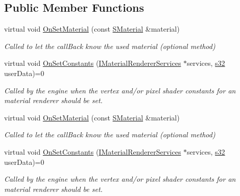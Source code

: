 \subsection*{Public Member Functions}
\begin{DoxyCompactItemize}
\item 
virtual void \hyperlink{classirr_1_1video_1_1IShaderConstantSetCallBack_a837ad9419ca4c17b011af75bb24e7a72}{On\+Set\+Material} (const \hyperlink{classirr_1_1video_1_1SMaterial}{S\+Material} \&material)
\begin{DoxyCompactList}\small\item\em Called to let the call\+Back know the used material (optional method) \end{DoxyCompactList}\item 
virtual void \hyperlink{classirr_1_1video_1_1IShaderConstantSetCallBack_a91cf4eb8d20d278defaca4e3c9390396}{On\+Set\+Constants} (\hyperlink{classirr_1_1video_1_1IMaterialRendererServices}{I\+Material\+Renderer\+Services} $\ast$services, \hyperlink{namespaceirr_ac66849b7a6ed16e30ebede579f9b47c6}{s32} user\+Data)=0
\begin{DoxyCompactList}\small\item\em Called by the engine when the vertex and/or pixel shader constants for an material renderer should be set. \end{DoxyCompactList}\item 
virtual void \hyperlink{classirr_1_1video_1_1IShaderConstantSetCallBack_a837ad9419ca4c17b011af75bb24e7a72}{On\+Set\+Material} (const \hyperlink{classirr_1_1video_1_1SMaterial}{S\+Material} \&material)
\begin{DoxyCompactList}\small\item\em Called to let the call\+Back know the used material (optional method) \end{DoxyCompactList}\item 
virtual void \hyperlink{classirr_1_1video_1_1IShaderConstantSetCallBack_a91cf4eb8d20d278defaca4e3c9390396}{On\+Set\+Constants} (\hyperlink{classirr_1_1video_1_1IMaterialRendererServices}{I\+Material\+Renderer\+Services} $\ast$services, \hyperlink{namespaceirr_ac66849b7a6ed16e30ebede579f9b47c6}{s32} user\+Data)=0
\begin{DoxyCompactList}\small\item\em Called by the engine when the vertex and/or pixel shader constants for an material renderer should be set. \end{DoxyCompactList}\end{DoxyCompactItemize}
